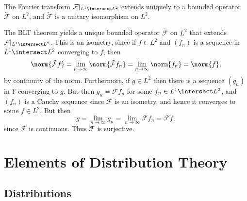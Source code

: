 \documentclass[article, a4paper, 11pt, oneside]{memoir}
\numberwithin{equation}{chapter}
\newcommand{\calF}{\mathcal{F}}
\newenvironment{displaytheorem}{%
	\begin{displayquote}\itshape%
}{%
	\end{displayquote}%
}
\theoremstyle{nonumberplain}
\begin{document}
\begin{remarkbreak}
	\begin{displaytheorem}
		The Fourier transform $\calF|_{L^1 \intersect L^2}$ extends uniquely to a bounded operator $\tilde{\calF}$ on $L^2$, and $\tilde{\calF}$ is a unitary isomorphism on $L^2$.
	\end{displaytheorem}
	The BLT theorem yields a unique bounded operator $\tilde{\calF}$ on $L^2$ that extends $\calF|_{L^1 \intersect L^2}$. This is an isometry, since if $f \in L^2$ and $(f_n)$ is a sequence in $L^1 \intersect L^2$ converging to $f$, then
	\begin{equation*}
		\norm{\tilde{\calF} f}
			= \lim_{n \to \infty} \norm{\tilde{\calF} f_n}
			= \lim_{n \to \infty} \norm{f_n}
			= \norm{f},
	\end{equation*}
	by continuity of the norm. Furthermore, if $g \in L^2$ then there is a sequence $(g_n)$ in $Y$ converging to $g$. But then $g_n = \calF f_n$ for some $f_n \in L^1 \intersect L^2$, and $(f_n)$ is a Cauchy sequence since $\calF$ is an isometry, and hence it converges to some $f \in L^2$. But then
	\begin{equation*}
		g
			= \lim_{n \to \infty} g_n
			= \lim_{n \to \infty} \calF f_n
			= \calF f,
	\end{equation*}
	since $\calF$ is continuous. Thus $\tilde{\calF}$ is surjective.
\end{remarkbreak}


\chapter{Elements of Distribution Theory}

\section{Distributions}

\newcommand{\loc}{\mathrm{loc}}
\end{document}

